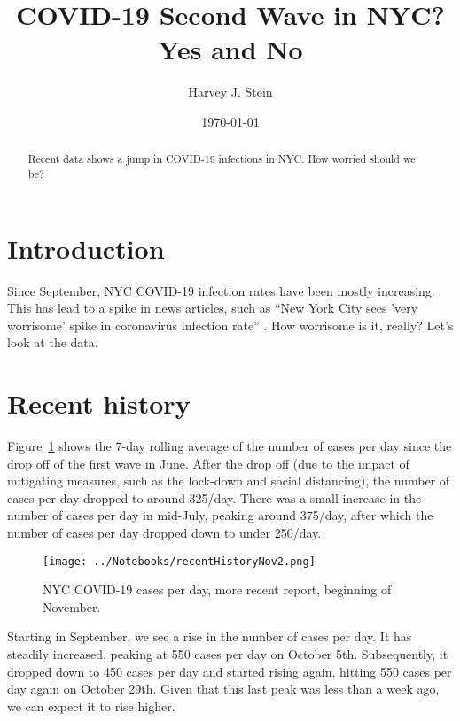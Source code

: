 \documentclass[10pt,reqno]{amsart}
\author{Harvey J. Stein}
\date{\today}
\begin{document}
\title{COVID-19 Second Wave in NYC?  Yes and No}

\begin{abstract}
  Recent data shows a jump in COVID-19 infections in NYC.  How worried
  should we be?
\end{abstract}



\maketitle
\tableofcontents

\section{Introduction}
\label{sec:intro}
Since September, NYC COVID-19 infection rates have been mostly
increasing.  This has lead to a spike in news articles, such as ``New
York City sees 'very worrisome' spike in coronavirus infection rate''
\cite{Politico2020Worrisome}.  How worrisome is it, really?  Let's
look at the data.

\section{Recent history}
\label{sec:recent}

Figure~\ref{fig:dailyRecent} shows the 7-day rolling average of the
number of cases per day since the drop off of the first wave in June.
After the drop off (due to the impact of mitigating measures, such as
the lock-down and social distancing), the number of cases per day
dropped to around 325/day.  There was a small increase in the number
of cases per day in mid-July, peaking around 375/day, after which the
number of cases per day dropped down to under 250/day.

\begin{figure}[h!tbp]
  \centering
  \texttt{[image: ../Notebooks/recentHistoryNov2.png]}
  \caption{NYC COVID-19 cases per day, more recent report, beginning
    of November.}
  \label{fig:dailyRecent}
\end{figure}

Starting in September, we see a rise in the number of cases per
day.  It has steadily increased, peaking at 550 cases per day on
October 5th.  Subsequently, it dropped down to 450 cases per day and started
rising again, hitting 550 cases per day again on October 29th.  Given
that this last peak was less than a week ago, we can expect it to rise
higher.
\end{document}

